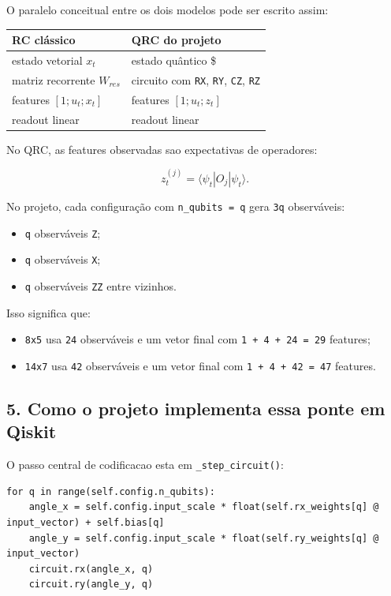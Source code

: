 \documentclass[12pt]{article}
\providecommand{\tightlist}{%
  \setlength{\itemsep}{0pt}\setlength{\parskip}{0pt}}
\begin{document}
O paralelo conceitual entre os dois modelos pode ser escrito assim:

\begin{longtable}[]{@{}ll@{}}
\toprule\noalign{}
RC clássico & QRC do projeto \\
\midrule\noalign{}
\endhead
\bottomrule\noalign{}
\endlastfoot
estado vetorial \(x_t\) & estado quântico \$ \\
matriz recorrente \(W_{res}\) & circuito com \texttt{RX}, \texttt{RY}, \texttt{CZ}, \texttt{RZ} \\
features \([1; u_t; x_t]\) & features \([1; u_t; z_t]\) \\
readout linear & readout linear \\
\end{longtable}

No QRC, as features observadas sao expectativas de operadores:

\[
z_t^{(j)} = \langle \psi_t | O_j | \psi_t \rangle.
\]

No projeto, cada configuração com \texttt{n\_qubits\ =\ q} gera \texttt{3q} observáveis:

\begin{itemize}
\tightlist
\item
  \texttt{q} observáveis \texttt{Z};
\item
  \texttt{q} observáveis \texttt{X};
\item
  \texttt{q} observáveis \texttt{ZZ} entre vizinhos.
\end{itemize}

Isso significa que:

\begin{itemize}
\tightlist
\item
  \texttt{8x5} usa \texttt{24} observáveis e um vetor final com \texttt{1\ +\ 4\ +\ 24\ =\ 29} features;
\item
  \texttt{14x7} usa \texttt{42} observáveis e um vetor final com \texttt{1\ +\ 4\ +\ 42\ =\ 47} features.
\end{itemize}

\subsection{5. Como o projeto implementa essa ponte em Qiskit}\label{5-como-o-projeto-implementa-essa-ponte-em-qiskit}

O passo central de codificacao esta em \texttt{\_step\_circuit()}:

\begin{verbatim}
for q in range(self.config.n_qubits):
    angle_x = self.config.input_scale * float(self.rx_weights[q] @ input_vector) + self.bias[q]
    angle_y = self.config.input_scale * float(self.ry_weights[q] @ input_vector)
    circuit.rx(angle_x, q)
    circuit.ry(angle_y, q)
\end{verbatim}
\end{document}
